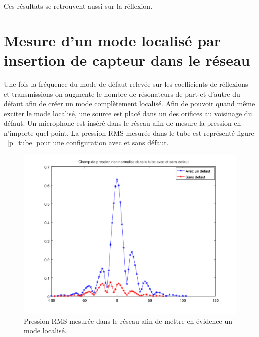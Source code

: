 Ces résultats se retrouvent aussi sur la réflexion.
%

\section{Mesure d'un mode localisé par insertion de capteur dans le réseau}



Une fois la fréquence du mode de défaut relevée sur les coefficients de réflexions et transmissions on augmente le nombre de résonateurs de part et d'autre du défaut afin de créer un mode complètement localisé. Afin de pouvoir quand même exciter le mode localisé, une source est placé dans un des orifices au voisinage du défaut. Un microphone est inséré dans le réseau afin de mesure la pression en n'importe quel point. La pression RMS mesurée dans le tube est représenté figure ~\ref{p_tube} pour une configuration avec et sans défaut.

\begin{figure}[!h]
\centering
\includegraphics[scale=0.5]{./images_chp3/non_norm_lin.png}
\caption{\label{_tube} Pression RMS mesurée dans le réseau afin de mettre en évidence un mode localisé.}
\end{figure}

